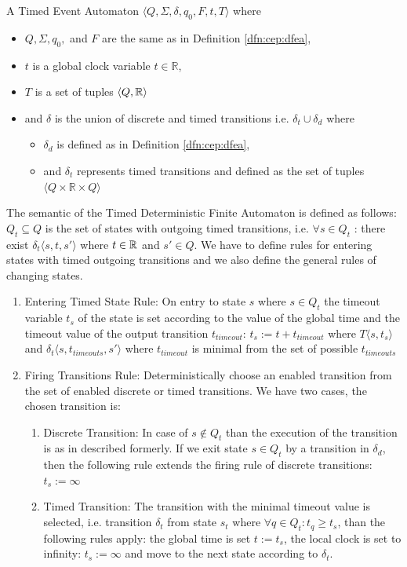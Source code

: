 			\begin{dfn}
				\label{dfn:cep:TEA}
				A Timed Event Automaton $\langle Q,\Sigma,\delta,q_0, F, t, T \rangle$ where
				\begin{itemize}
					\item $Q, \Sigma, q_0,$ and $F$ are the same as in Definition \ref{dfn:cep:dfea},
					\item $t$ is a global clock variable $t \in \mathbb{R}$,
					\item $T$ is a set of tuples $\langle Q, \mathbb{R} \rangle$
					\item and $\delta$ is the union of discrete and timed transitions i.e. $\delta_t \cup \delta_d$ where
					\begin{itemize}
						\item $\delta_d$ is defined as in Definition \ref{dfn:cep:dfea},
						\item and $\delta_t$ represents timed transitions and defined as the set of tuples $\langle Q \times \mathbb{R} \times Q \rangle$ 
					\end{itemize}
				\end{itemize}
			\end{dfn}
			
			The semantic of the Timed Deterministic Finite Automaton is defined as follows:
			$Q_t \subseteq Q$ is the set of states with outgoing timed transitions, i.e. $\forall s \in Q_t$ : there exist $ \delta_t\langle s, t, s' \rangle$ where $t \in \mathbb{R}$ and $s' \in Q$.
			We have to define rules for entering states with timed outgoing transitions and we also define the general rules of changing states. 
			\begin{enumerate}
				\item Entering Timed State Rule: On entry to state $s$ where $s \in Q_t$ the timeout variable $t_s$ of the state is set according to the value of the global time and the timeout value of the output transition $t_{timeout}$:
					$t_s:= t+t_{timeout}$ %
					where $T\langle s,t_s \rangle$ and $\delta_t\langle s,t_{timeouts},s' \rangle$ where $t_{timeout}$ is minimal from the set of possible $t_{timeouts}$ 
				
				\item Firing Transitions Rule: Deterministically choose an enabled transition from the set of enabled discrete or timed transitions. We have two cases, the chosen transition is:
					\begin{enumerate}
						\item Discrete Transition: In case of $s \notin Q_t$ than the execution of the transition is as in described formerly. If we exit state $s \in Q_t$ by a transition in $\delta_d$, 
						then the following rule extends the firing rule of discrete transitions:
							$t_s := \infty$
						\item Timed Transition: The transition with the minimal timeout value is selected, i.e. transition $\delta_t$ from state $s_t$ where $\forall q \in Q_t: t_q \geq t_s$, than the following rules apply:
						 the global time is set $t := t_s$, the local clock is set to infinity: $t_s := \infty$ and move to the next state according to $\delta_t$.
					\end{enumerate}			
			\end{enumerate}
			
